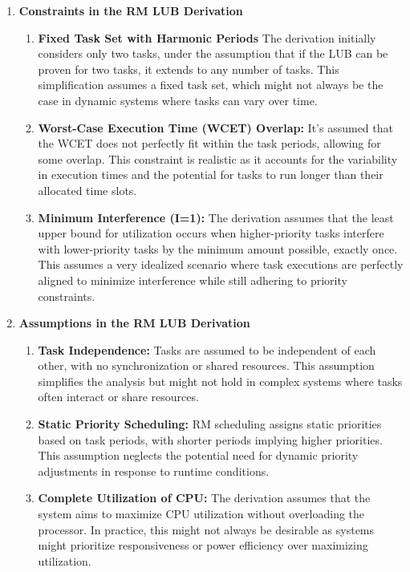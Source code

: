 \documentclass[a4paper,11pt]{article}%
\newenvironment{qanda}{\setlength{\parindent}{0pt}}{\bigskip}
\begin{document}
\begin{qanda}
\begin{enumerate}
\begin{enumerate}
				      \begin{enumerate}
					      \item  \textbf{Constraints in the RM LUB Derivation}
					            \begin{enumerate}
						            \item \textbf{Fixed Task Set with Harmonic Periods} The derivation initially considers only two tasks, under the assumption that if the LUB can be proven for two tasks, it extends to any number of tasks. This simplification assumes a fixed task set, which might not always be the case in dynamic systems where tasks can vary over time.
						            \item
						                  \textbf{Worst-Case Execution Time (WCET) Overlap:} It's assumed that the WCET does not perfectly fit within the task periods, allowing for some overlap. This constraint is realistic as it accounts for the variability in execution times and the potential for tasks to run longer than their allocated time slots.
						            \item
						                  \textbf{Minimum Interference (I=1):} The derivation assumes that the least upper bound for utilization occurs when higher-priority tasks interfere with lower-priority tasks by the minimum amount possible, exactly once. This assumes a very idealized scenario where task executions are perfectly aligned to minimize interference while still adhering to priority constraints.
					            \end{enumerate}

					      \item  \textbf{Assumptions in the RM LUB Derivation}
					            \begin{enumerate}
						            \item \textbf{Task Independence:} Tasks are assumed to be independent of each other, with no synchronization or shared resources. This assumption simplifies the analysis but might not hold in complex systems where tasks often interact or share resources.
						            \item
						                  \textbf{Static Priority Scheduling:} RM scheduling assigns static priorities based on task periods, with shorter periods implying higher priorities. This assumption neglects the potential need for dynamic priority adjustments in response to runtime conditions.
						            \item
						                  \textbf{Complete Utilization of CPU:} The derivation assumes that the system aims to maximize CPU utilization without overloading the processor. In practice, this might not always be desirable as systems might prioritize responsiveness or power efficiency over maximizing utilization.


\end{enumerate}
\end{enumerate}
\end{enumerate}
\end{enumerate}
\end{qanda}
\end{document}

